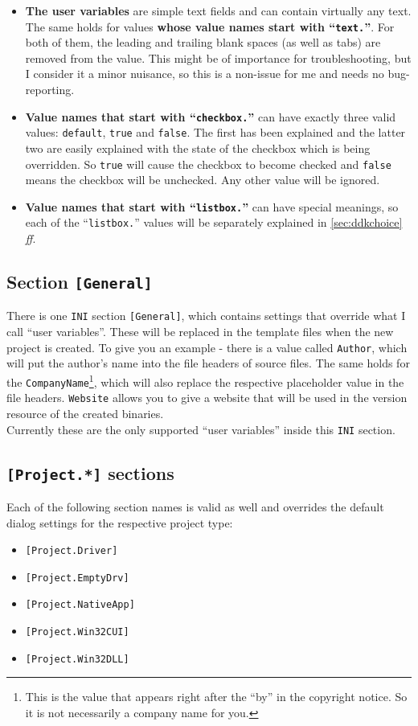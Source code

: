\documentclass[a4paper,titlepage]{report}
\begin{document}
\begin{itemize}
  \item \textbf{The user variables} are simple text fields and can
contain virtually any text. The same holds for values \textbf{whose value names start with
``\texttt{text.}''}. For both of them, the leading and trailing blank spaces (as well
as tabs) are removed from the value. This might be of importance for troubleshooting,
but I consider it a minor nuisance, so this is a non-issue for me and needs no bug-reporting.

  \item \textbf{Value names that start with ``\texttt{checkbox.}''} can have exactly three valid values: \texttt{default},
\texttt{true} and \texttt{false}. The first has been explained and the latter two are
easily explained with the state of the checkbox which is being overridden. So \texttt{true}
will cause the checkbox to become checked and \texttt{false} means the checkbox will be unchecked.
Any other value will be ignored.

  \item \textbf{Value names that start with ``\texttt{listbox.}''} can have special meanings, so each
of the ``\texttt{listbox.}'' values will be separately explained in \autoref{sec:ddkchoice} \emph{ff}.
\end{itemize}

\subsection{Section \texttt{[General]}}\label{sec:authorandcompany}
There is one \texttt{INI} section \verb+[General]+, which contains settings that override what
I call ``user variables''. These will be replaced in the template files when the
new project is created. To give you an example - there is a value called \texttt{Author},
which will put the author's name into the file headers of source files. The same holds
for the \texttt{CompanyName}\footnote{This is the value that appears right after the ``by''
in the copyright notice. So it is not necessarily a company name for you.}, which will
also replace the respective placeholder value in the file headers. \texttt{Website}
allows you to give a website that will be used in the version resource of the created
binaries.\\
Currently these are the only supported ``user variables'' inside this \texttt{INI} section.

\subsection{\texttt{[Project.*]} sections}
Each of the following section names is valid as well and overrides the default dialog
settings for the respective project type:
\begin{itemize}
  \item \texttt{[Project.Driver]}
  \item \texttt{[Project.EmptyDrv]}
  \item \texttt{[Project.NativeApp]}
  \item \texttt{[Project.Win32CUI]}
  \item \texttt{[Project.Win32DLL]}
\end{itemize}
\end{document}
